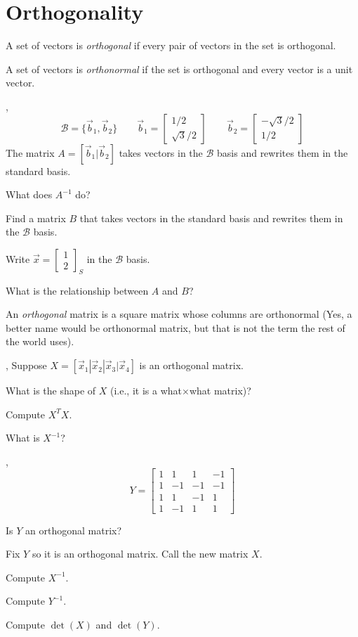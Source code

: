 \documentclass{article}
\newcommand{\mat}[1]{\begin{bmatrix}#1\end{bmatrix}}
\begin{document}
\section*{Orthogonality}
	\begin{Def}
		A set of vectors is \emph{orthogonal} if every pair of vectors
		in the set is orthogonal.
	\end{Def}

	\begin{Def}
		A set of vectors is \emph{orthonormal} if the set is orthogonal
		and every vector is a unit vector.
	\end{Def}

	\sep
	\[
		\mathcal B=\{\vec b_1,\vec b_2\}\qquad\vec b_1=\mat{1/2\\\sqrt{3}/2}
		\qquad \vec b_2=\mat{-\sqrt{3}/2\\1/2}
	\]
	The matrix $A=[\vec b_1|\vec b_2]$ takes vectors in the $\mathcal B$ basis
	and rewrites them in the standard basis.
	\begin{Enum}
		\item What does $A^{-1}$ do?
		\item Find a matrix $B$ that takes vectors in the standard basis
			and rewrites them in the $\mathcal B$ basis.
		\item Write $\vec x=\mat{1\\2}_S$ in the $\mathcal B$ basis.
		\item What is the relationship between $A$ and $B$?
	\end{Enum}

	\begin{Def}
		An \emph{orthogonal} matrix is a square matrix whose columns are
		orthonormal (Yes, a better name would be orthonormal matrix, but that
		is not the term the rest of the world uses).
	\end{Def}

	\sep
	Suppose $X=[\vec x_1|\vec x_2|\vec x_3|\vec x_4]$ is an orthogonal matrix.
	\begin{Enum}
		\item What is the shape of $X$ (i.e., it is a what$\times$what matrix)?
		\item Compute $X^TX$.
		\item What is $X^{-1}$?
	\end{Enum}

	\sep
	\[
		Y=\mat{1&1&1&-1\\1&-1&-1&-1\\1&1&-1&1\\1&-1&1&1}
	\]
	\begin{Enum}
		\item Is $Y$ an orthogonal matrix?
		\item Fix $Y$ so it is an orthogonal matrix.  Call the new matrix $X$.
		\item Compute $X^{-1}$.
		\item Compute $Y^{-1}$.
		\item Compute $\det(X)$ and $\det(Y)$.
	\end{Enum}
\end{document}
